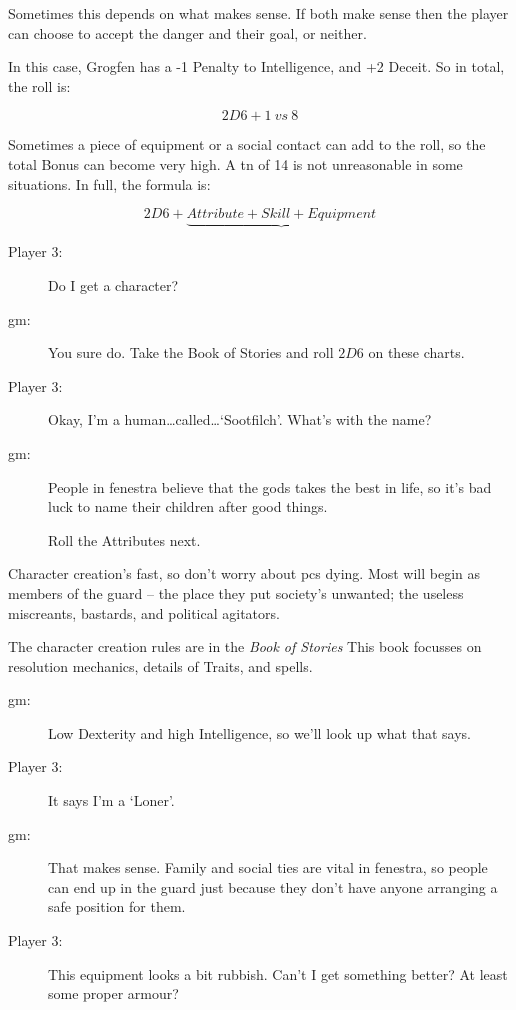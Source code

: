 \begin{multicols}{3}
Sometimes this depends on what makes sense.
If both make sense then the player can choose to accept the danger and their goal, or neither.

In this case, Grogfen has a -1 Penalty to Intelligence, and +2 Deceit.
So in total, the roll is:

$$2D6 + 1 ~vs~ 8$$

\noindent
Sometimes a piece of equipment or a social contact can add to the roll, so the total Bonus can become very high.
A \gls{tn} of 14 is not unreasonable in some situations.
In full, the formula is:

$$2D6 + \underbrace{Attribute + Skill + Equipment}$$

\bigLine
\vspace{\baselineskip}

\begin{description}
  \item[Player 3:]
  Do I get a character?
  \item[\gls{gm}:]
  You sure do.
  Take the Book of Stories and roll $2D6$ on these charts.
  \item[Player 3:]
  Okay, I'm a human\ldots called\ldots `Sootfilch'.
  What's with the name?
  \item[\gls{gm}:]
  People in \gls{fenestra} believe that the gods takes the best in life, so it's bad luck to name their children after good things.

  Roll the Attributes next.
\end{description}

\bigLine
\vspace{\baselineskip}

Character creation's fast, so don't worry about \glspl{pc} dying.
Most will begin as members of the \gls{guard} -- the place they put society's unwanted; the useless miscreants, bastards, and political agitators.

The character creation rules are in the \textit{Book of Stories}%
\iftoggle{stories}{, \autopageref{character_rolls}.}{.}
This book focusses on resolution mechanics, details of Traits, and spells.

\begin{description}
  \item[\gls{gm}:]
  Low Dexterity and high Intelligence, so we'll look up what that says.
  \item[Player 3:]
  It says I'm a `Loner'.
  \item[\gls{gm}:]
  That makes sense.
  Family and social ties are vital in \gls{fenestra}, so people can end up in the \gls{guard} just because they don't have anyone arranging a safe position for them.
  \item[Player 3:]
  This equipment looks a bit rubbish.
  Can't I get something better?
  At least some proper armour?
\end{description}


\end{multicols}
